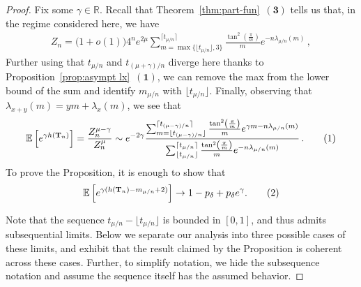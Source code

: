 \documentclass{article}
\newcommand{\E}{\mathbb{E}}								%
\newcommand{\Exp}[1]{\E\left[#1\right]}					%
\newcommand{\1}{\mathbbm{1}}								%
\newcommand\numberthis{\addtocounter{equation}{1}\tag{\theequation}}
\theoremstyle{definition}
\numberwithin{equation}{section}
\newcommand{\bT}{\mathbf T}
\newcommand{\R}{\mathbb R}
\newcommand{\numitem}[1]{$\mathbf{(#1)}$}
\begin{document}
\begin{proof}
    Fix some $\gamma\in\R$.
    Recall that Theorem~\ref{thm:part-fun}~\numitem{3} tells us that, in the regime considered here, we have
    \begin{align*}
        Z_n=\big(1+o(1)\big)4^ne^{2\mu}\sum_{m=\max\{\lfloor t_{\mu/n}\rfloor,3\}}^{\lceil t_{\mu/n}\rceil}\frac{\tan^2\left(\frac{\pi}{m}\right)}{m}e^{-n\lambda_{\mu/n}(m)}\,,
    \end{align*}
    Further using that $t_{\mu/n}$ and $t_{(\mu+\gamma)/n}$ diverge here thanks to
    Proposition~\ref{prop:asympt lx}~\numitem{1}, we can remove the max from the lower bound of the sum and identify $m_{\mu/n}$ with $\lfloor t_{\mu/n}\rfloor$.
    Finally, observing that $\lambda_{x+y}(m)=ym+\lambda_x(m)$, we see that
    \begin{align*}
        \E\left[e^{\gamma h(\bT_n)}\right]=\frac{Z_n^{\mu-\gamma}}{Z_n^\mu}\sim e^{-2\gamma}\frac{\sum_{m=\lfloor t_{(\mu-\gamma)/n}\rfloor}^{\lceil t_{(\mu-\gamma)/n}\rceil}\frac{\tan^2\left(\frac{\pi}{m}\right)}{m}e^{\gamma m-n\lambda_{\mu/n}(m)}}{\sum_{\lfloor t_{\mu/n}\rfloor}^{\lceil t_{\mu/n}\rceil}\frac{\tan^2\left(\frac{\pi}{m}\right)}{m}e^{-n\lambda_{\mu/n}(m)}}\,. \numberthis \label{eq:mulln_mom_gen_func}
    \end{align*}
{To prove the Proposition, it is enough to show that 
\begin{align*}
    \Exp{e^{\gamma (h(\bT_n)-m_{\mu/n}+2)}}\to 1-p_\delta+p_\delta e^\gamma. \numberthis\label{eq:limiting_bernoulli_mgf}
\end{align*}}

   {Note that the sequence $t_{\mu/n}-\lfloor t_{\mu/n} \rfloor$ is bounded in $[0,1]$, and thus admits subsequential limits. Below we separate our analysis into three possible cases of these limits, and exhibit that the result claimed by the Proposition is coherent across these cases. Further, to simplify notation, we hide the subsequence notation and assume the sequence itself has the assumed behavior.}


\end{proof}
\end{document}
